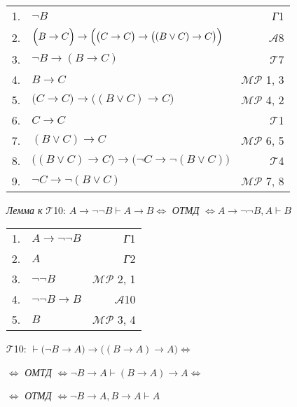 \documentclass{article}
\begin{document}
\begin{enumerate}
\begin{tabular}{llr}
1. & $\neg B$ & \textit{Г}1\\
2. & $\Bigl(B\rightarrow C\Bigr)\rightarrow\Bigl(\bigl(C\rightarrow C\bigr)\rightarrow\bigl(\left(B\lor C\right)\rightarrow C\bigr)\Bigr)$ & $\mathcal{A}$8\\
3. & $\neg B\rightarrow\left(B\rightarrow C\right)$ & $\mathcal{T}$7\\
4. & $B\rightarrow C$ & $\mathcal{MP}$ 1, 3\\
5. & $\bigl(C\rightarrow C\bigr)\rightarrow\bigl(\left(B\lor C\right)\rightarrow C\bigr)$ & $\mathcal{MP}$ 4, 2\\
6. & $C\rightarrow C$ & $\mathcal{T}$1\\
7. & $\left(B\lor C\right)\rightarrow C$ & $\mathcal{MP}$ 6, 5\\
8. & $\bigl(\left(B\lor C\right)\rightarrow C\bigr)\rightarrow\bigl(\neg C\rightarrow\neg\left(B\lor C\right)\bigr)$ & $\mathcal{T}$4\\
9. & $\neg C\rightarrow\neg\left(B\lor C\right)$ & $\mathcal{MP}$ 7, 8
\end{tabular}
\item[\textit{Лемма к }$\mathcal{T}$10:] $A\rightarrow\neg\neg B\vdash A\rightarrow B\Leftrightarrow$ \textit{ОТМД} $\Leftrightarrow A\rightarrow\neg\neg B, A\vdash B$

\begin{tabular}{llr}
1. & $A\rightarrow\neg\neg B$ & \textit{Г}1\\
2. & $A$ & \textit{Г}2\\
3. & $\neg\neg B$ & $\mathcal{MP}$ 2, 1\\
4. & $\neg\neg B\rightarrow B$ & $\mathcal{A}$10\\
5. & $B$ & $\mathcal{MP}$ 3, 4
\end{tabular}

\item[$\mathcal{T}$10:] $\vdash\bigl(\neg B\rightarrow A\bigr)\rightarrow\bigl(\left(B\rightarrow A\right)\rightarrow A\bigr)\Leftrightarrow$

$\Leftrightarrow$ \textit{ОМТД} $\Leftrightarrow\neg B\rightarrow A\vdash\left(B\rightarrow A\right)\rightarrow A\Leftrightarrow$

$\Leftrightarrow$ \textit{ОТМД} $\Leftrightarrow\neg B\rightarrow A, B\rightarrow A\vdash A$


\end{enumerate}
\end{document}
